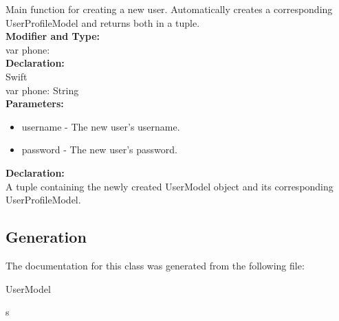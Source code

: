 Main function for creating a new user. Automatically creates a corresponding UserProfileModel and returns both in a tuple.\\

\textbf{Modifier and Type:}\\
\tab var phone:\\


\textbf{Declaration:}\\
\tab 
Swift\\

var phone: String\\

\textbf{Parameters:}
\begin{itemize}
\item username - The new user’s username.
\item password - The new user’s password.
\end{itemize}

\textbf{Declaration:}\\
A tuple containing the newly created UserModel object and its corresponding UserProfileModel.\\


\subsection{Generation}
The documentation for this class was generated from the following file\-:
\begin{DoxyCompactItemize}
\item UserModel
\end{DoxyCompactItemize} 









s